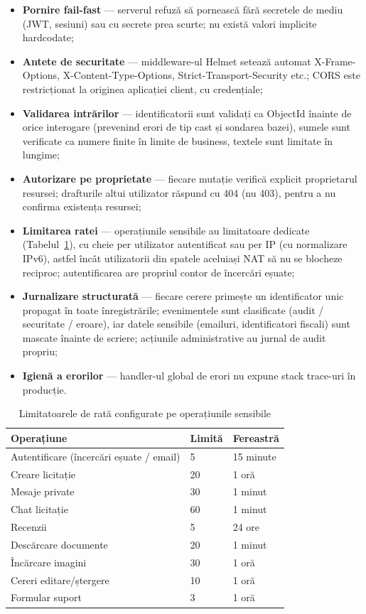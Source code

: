 \begin{itemize}
    \item \textbf{Pornire fail-fast} --- serverul refuză să pornească fără secretele de mediu (JWT, sesiuni) sau cu secrete prea scurte; nu există valori implicite hardcodate;
    \item \textbf{Antete de securitate} --- middleware-ul Helmet setează automat X-Frame-Options, X-Content-Type-Options, Strict-Transport-Security etc.; CORS este restricționat la originea aplicației client, cu credențiale;
    \item \textbf{Validarea intrărilor} --- identificatorii sunt validați ca ObjectId înainte de orice interogare (prevenind erori de tip cast și sondarea bazei), sumele sunt verificate ca numere finite în limite de business, textele sunt limitate în lungime;
    \item \textbf{Autorizare pe proprietate} --- fiecare mutație verifică explicit proprietarul resursei; drafturile altui utilizator răspund cu 404 (nu 403), pentru a nu confirma existența resursei;
    \item \textbf{Limitarea ratei} --- operațiunile sensibile au limitatoare dedicate (Tabelul~\ref{tab:rate-limits}), cu cheie per utilizator autentificat sau per IP (cu normalizare IPv6), astfel încât utilizatorii din spatele aceluiași NAT să nu se blocheze reciproc; autentificarea are propriul contor de încercări eșuate;
    \item \textbf{Jurnalizare structurată} --- fiecare cerere primește un identificator unic propagat în toate înregistrările; evenimentele sunt clasificate (audit / securitate / eroare), iar datele sensibile (emailuri, identificatori fiscali) sunt mascate înainte de scriere; acțiunile administrative au jurnal de audit propriu;
    \item \textbf{Igienă a erorilor} --- handler-ul global de erori nu expune stack trace-uri în producție.
\end{itemize}

\begin{table}[!ht]\small\linespread{1}
\centering
\caption{Limitatoarele de rată configurate pe operațiunile sensibile}
\label{tab:rate-limits}
\begin{tabular}{>{\raggedright\arraybackslash}p{6cm} l l}
\toprule
\textbf{Operațiune} & \textbf{Limită} & \textbf{Fereastră} \\
\midrule
Autentificare (încercări eșuate / email) & 5 & 15 minute \\
Creare licitație & 20 & 1 oră \\
Mesaje private & 30 & 1 minut \\
Chat licitație & 60 & 1 minut \\
Recenzii & 5 & 24 ore \\
Descărcare documente & 20 & 1 minut \\
Încărcare imagini & 30 & 1 oră \\
Cereri editare/ștergere & 10 & 1 oră \\
Formular suport & 3 & 1 oră \\
\bottomrule
\end{tabular}
\end{table}

